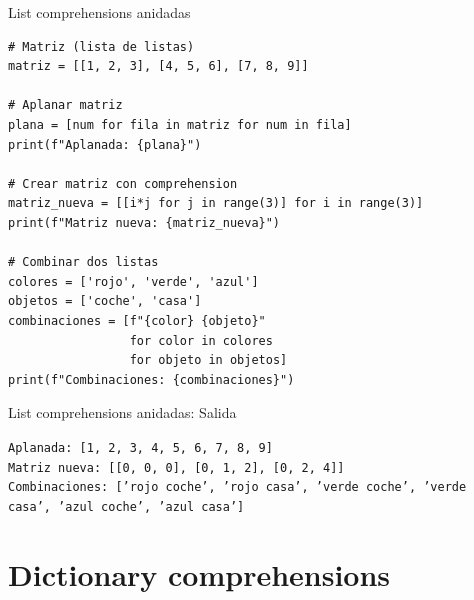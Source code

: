 \documentclass{beamer}
\begin{document}
\begin{frame}[fragile]{List comprehensions anidadas \faLayerGroup}
\begin{lstlisting}
# Matriz (lista de listas)
matriz = [[1, 2, 3], [4, 5, 6], [7, 8, 9]]

# Aplanar matriz
plana = [num for fila in matriz for num in fila]
print(f"Aplanada: {plana}")

# Crear matriz con comprehension
matriz_nueva = [[i*j for j in range(3)] for i in range(3)]
print(f"Matriz nueva: {matriz_nueva}")

# Combinar dos listas
colores = ['rojo', 'verde', 'azul']
objetos = ['coche', 'casa']
combinaciones = [f"{color} {objeto}" 
                 for color in colores 
                 for objeto in objetos]
print(f"Combinaciones: {combinaciones}")
\end{lstlisting}
\end{frame}

\begin{frame}[fragile]{List comprehensions anidadas: Salida \faArrowCircleRight}
\begin{tcolorbox}[colback=green!10,colframe=green,title={\small\faArrowCircleRight \ Salida},coltitle=fg0,left=3pt,right=3pt,top=2pt,bottom=2pt,boxsep=1pt]
\tiny\texttt{Aplanada: [1, 2, 3, 4, 5, 6, 7, 8, 9]\\
Matriz nueva: [[0, 0, 0], [0, 1, 2], [0, 2, 4]]\\
Combinaciones: ['rojo coche', 'rojo casa', 'verde coche', 'verde casa', 'azul coche', 'azul casa']}
\end{tcolorbox}
\end{frame}

\section{Dictionary comprehensions}
\end{document}
